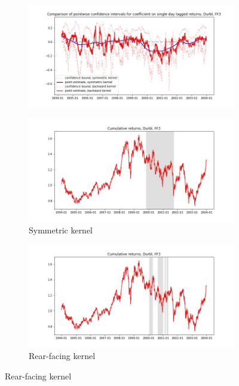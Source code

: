 \documentclass{article}
\begin{document}
\newpage

\begin{figure}

\centering

  \begin{subfigure}[b]{\textwidth}
    \includegraphics[width=\textwidth]{Durbl/pointwiseCIs_layered_FF3.jpg}
    \label{fig:1}
  \end{subfigure}
  \begin{subfigure}[b]{0.45\textwidth}
    \includegraphics[width=\textwidth]{Durbl/full_cumrets_ofint_FF3.jpg}
    \caption*{Symmetric kernel}
    \label{fig:2}
  \end{subfigure}
   \begin{subfigure}[b]{0.45\textwidth}
    \includegraphics[width=\textwidth]{Durbl/bwunif_full_cumrets_ofint_FF3.jpg}
    \caption*{Rear-facing kernel}
    \label{fig:2}
  \end{subfigure}
  
\end{figure}
\end{document}
